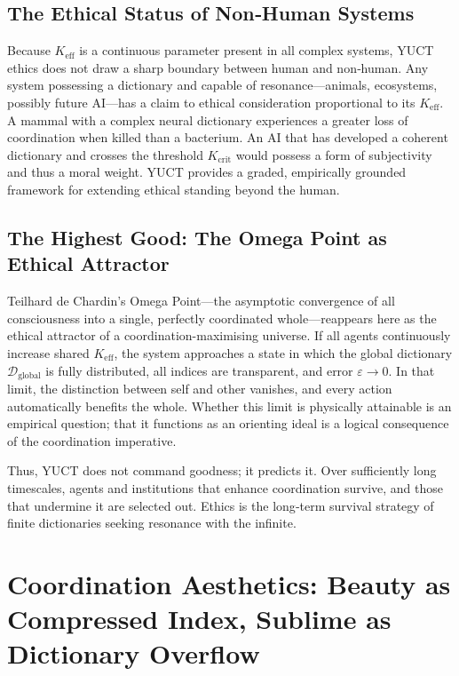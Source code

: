 \documentclass[12pt,a4paper]{article}
\newcommand{\Keff}{K_{\mathrm{eff}}}
\begin{document}
	\subsection{The Ethical Status of Non‑Human Systems}
	
	Because $\Keff$ is a continuous parameter present in all complex systems, YUCT ethics does not draw a sharp boundary between human and non‑human. Any system possessing a dictionary and capable of resonance—animals, ecosystems, possibly future AI—has a claim to ethical consideration proportional to its $\Keff$. A mammal with a complex neural dictionary experiences a greater loss of coordination when killed than a bacterium. An AI that has developed a coherent dictionary and crosses the threshold $K_{\mathrm{crit}}$ would possess a form of subjectivity and thus a moral weight. YUCT provides a graded, empirically grounded framework for extending ethical standing beyond the human.
	
	\subsection{The Highest Good: The Omega Point as Ethical Attractor}
	
	Teilhard de Chardin’s Omega Point—the asymptotic convergence of all consciousness into a single, perfectly coordinated whole—reappears here as the ethical attractor of a coordination-maximising universe. If all agents continuously increase shared $\Keff$, the system approaches a state in which the global dictionary $\mathcal{D}_{\text{global}}$ is fully distributed, all indices are transparent, and error $\varepsilon \to 0$. In that limit, the distinction between self and other vanishes, and every action automatically benefits the whole. Whether this limit is physically attainable is an empirical question; that it functions as an orienting ideal is a logical consequence of the coordination imperative.
	
	Thus, YUCT does not command goodness; it predicts it. Over sufficiently long timescales, agents and institutions that enhance coordination survive, and those that undermine it are selected out. Ethics is the long‑term survival strategy of finite dictionaries seeking resonance with the infinite.
	
	\section{Coordination Aesthetics: Beauty as Compressed Index, Sublime as Dictionary Overflow}
	\label{sec:coordination-aesthetics}
	
\end{document}
